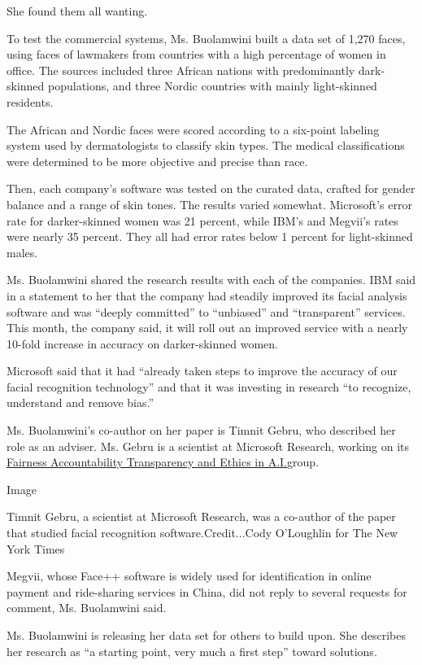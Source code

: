 She found them all wanting.

To test the commercial systems, Ms. Buolamwini built a data set of 1,270
faces, using faces of lawmakers from countries with a high percentage of
women in office. The sources included three African nations with
predominantly dark-skinned populations, and three Nordic countries with
mainly light-skinned residents.

The African and Nordic faces were scored according to a six-point
labeling system used by dermatologists to classify skin types. The
medical classifications were determined to be more objective and precise
than race.

Then, each company's software was tested on the curated data, crafted
for gender balance and a range of skin tones. The results varied
somewhat. Microsoft's error rate for darker-skinned women was 21
percent, while IBM's and Megvii's rates were nearly 35 percent. They all
had error rates below 1 percent for light-skinned males.

Ms. Buolamwini shared the research results with each of the companies.
IBM said in a statement to her that the company had steadily improved
its facial analysis software and was ``deeply committed'' to
``unbiased'' and ``transparent'' services. This month, the company said,
it will roll out an improved service with a nearly 10-fold increase in
accuracy on darker-skinned women.

Microsoft said that it had ``already taken steps to improve the accuracy
of our facial recognition technology'' and that it was investing in
research ``to recognize, understand and remove bias.''

Ms. Buolamwini's co-author on her paper is Timnit Gebru, who described
her role as an adviser. Ms. Gebru is a scientist at Microsoft Research,
working on its
\href{https://www.microsoft.com/en-us/research/group/fate/}{Fairness
Accountability Transparency and Ethics in A.I.}group.

Image

Timnit Gebru, a scientist at Microsoft Research, was a co-author of the
paper that studied facial recognition software.Credit...Cody O'Loughlin
for The New York Times

Megvii, whose Face++ software is widely used for identification in
online payment and ride-sharing services in China, did not reply to
several requests for comment, Ms. Buolamwini said.

Ms. Buolamwini is releasing her data set for others to build upon. She
describes her research as ``a starting point, very much a first step''
toward solutions.

